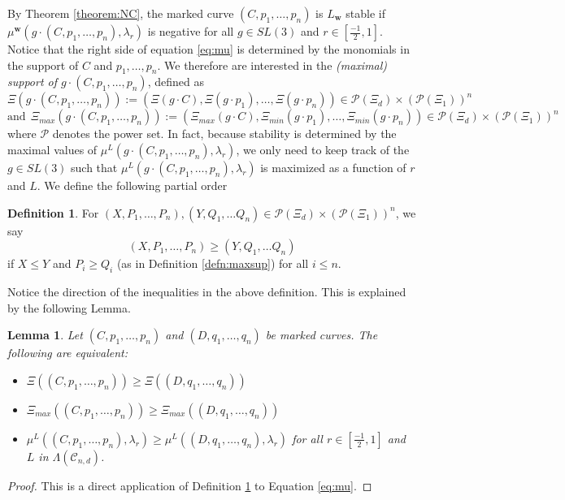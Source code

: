 \documentclass{amsart}
\newcommand{\mc}{\mathcal}
\numberwithin{equation}{section}
\newtheorem{lemma}[prop]{Lemma}
\theoremstyle{definition}
\newtheorem{defn}[prop]{Definition}
\begin{document}
By Theorem \ref{theorem:NC}, the marked curve $(C, p_1, \dots , p_n)$ is $L_{\mathbf{w}}$ stable if $\mu^{\mathbf{w}}( g \cdot (C,p_1, \ldots, p_n), \lambda_r)$ is negative for all $g \in SL(3)$ and $r \in [\frac{-1}{2}, 1]$. Notice that the right side of equation \ref{eq:mu} is determined by the monomials in the support of $C$ and  $p_1, \dots , p_n$. We therefore are interested in the \textit{(maximal) support of $g \cdot (C,p_1, \dots, p_n)$}, defined as
$$ \Xi(g \cdot (C, p_1, \dots , p_n)) := (\Xi(g \cdot C), \Xi(g \cdot p_1), \dots , \Xi(g \cdot p_n)) \in \mc{P}(\Xi_d) \times (\mc{P}(\Xi_1))^n$$
$$\text{and} \ \ \Xi_{max}(g \cdot (C, p_1, \dots , p_n)) := (\Xi_{max}(g \cdot C), \Xi_{min}(g \cdot p_1), \dots , \Xi_{min}(g \cdot p_n)) \in \mc{P}(\Xi_d) \times (\mc{P}(\Xi_1))^n$$
where $\mc{P}$ denotes the power set. In fact, because stability is determined by the maximal values of $ \mu^L(g \cdot (C,p_1, \ldots, p_n), \lambda_r)$, we only need to keep track of the $g \in SL(3)$ such that $\mu^L(g \cdot (C, p_1, \dots , p_n), \lambda_r)$ is maximized as a function of $r$ and $L$. We define the following partial order
\begin{defn}\label{defn:prodsupporder}
    For $(X, P_1, \dots , P_n), (Y, Q_1, \dots Q_n) \in \mc{P}(\Xi_d) \times (\mc{P}(\Xi_1))^n$, we say $$(X, P_1, \dots , P_n) \geq (Y, Q_1, \dots Q_n)$$ if $X \leq Y$ and $P_i \geq Q_i$ (as in Definition \ref{defn:maxsup}) for all $i \leq n$.
\end{defn}

Notice the direction of the inequalities in the above definition. This is explained by the following Lemma.
\begin{lemma}\label{lemma:maxmuxi}
    Let $(C, p_1, \dots , p_n)$ and $(D, q_1, \dots , q_n)$ be marked curves. The following are equivalent:
    
    \begin{itemize}
        \item $\Xi((C, p_1, \dots, p_n)) \geq \Xi((D, q_1, \dots, q_n))$ 
        \item $\Xi_{max}((C, p_1, \dots, p_n)) \geq \Xi_{max}((D, q_1, \dots, q_n))$ 
        \item $\mu^L((C, p_1, \dots, p_n), \lambda_r) \geq \mu^L((D, q_1, \dots, q_n), \lambda_r)$ for all $r \in [\frac{-1}{2},1]$ and $L$ in $\Lambda(\mc{C}_{n,d})$.
         
    \end{itemize}
\end{lemma}

\begin{proof}
    This is a direct application of Definition \ref{defn:prodsupporder} to Equation \ref{eq:mu}.
\end{proof}
\end{document}
